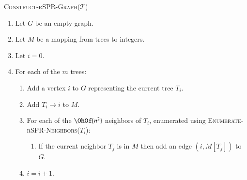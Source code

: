 \documentclass[]{elsarticle}
\begin{document}
\vspace{1em}
\textsc{Construct-rSPR-Graph($\mathcal{T}$)}
\begin{enumerate}[label={\arabic*}.]
	\item Let $G$ be an empty graph.
	\item Let $M$ be a mapping from trees to integers.
	\item Let $i = 0$.
	\item For each of the $m$ trees: \vspace{-0.2em}
		\begin{enumerate}
			\item Add a vertex $i$ to $G$ representing the current tree $T_i$.
			\item Add $T_i \rightarrow i$ to $M$.
			\item For each of the $\OhOf{n^2}$ neighbors of $T_i$, enumerated using \textsc{Enumerate-rSPR-Neighbors($T_i$)}:
				\begin{enumerate}
					\item If the current neighbor $T_j$ is in $M$ then add an edge $(i,M[T_j])$ to $G$.
				\end{enumerate}
		\item $i = i + 1$.
		\end{enumerate}
\end{enumerate}
\end{document}
